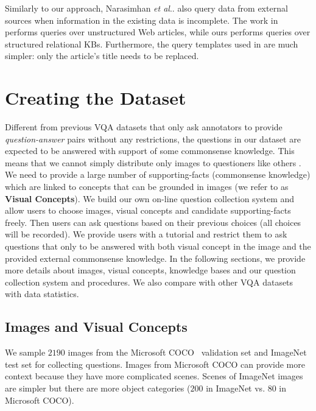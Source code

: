 \documentclass[10pt,journal]{IEEEtran}
\makeatletter
\DeclareRobustCommand\onedot{\futurelet\@let@token\@onedot}
\def\@onedot{\ifx\@let@token.\else.\null\fi\xspace}
\def\etal{\emph{et al}\onedot}
\def\bluett{}
\makeatother
\begin{document}
\bluett{
	Similarly to our approach, 
	Narasimhan \etal \cite{narasimhan2016improving} also query data from external sources when
	information in the existing data is incomplete.
	The work in \cite{narasimhan2016improving} performs queries over unstructured Web articles, while ours 
	performs queries over structured relational KBs.
	Furthermore, the query templates used in \cite{narasimhan2016improving} are much simpler: only the article’s title
	needs to be replaced.}



\section{Creating the \KBName Dataset}
\label{dataset}
Different from previous VQA datasets \cite{antol2015vqa,gao2015you,Yu_2015_ICCV,ren2015image,zhu2015visual7w} that only ask annotators to provide {\em question-answer} pairs without any restrictions, 
{the questions in our dataset are expected to be answered with support of some commonsense knowledge.}
This means that we cannot simply distribute only images to questioners like others \cite{antol2015vqa,zhu2015visual7w}. 
\bluett{
We need to provide a large number of supporting-facts (commonsense knowledge) which are linked to 
concepts that can be grounded in images (we refer to as {\bf Visual Concepts}). }
We build our own on-line question collection system and allow users to choose images, visual concepts and candidate supporting-facts freely. Then users can ask questions based on their previous choices (all choices will be recorded). We provide users with a tutorial and restrict them to ask questions that only to be answered with both visual concept in the image and the provided external commonsense knowledge. In the following sections, we provide more details about images, visual concepts, knowledge bases and our question collection system and procedures. We also compare with other VQA datasets with data statistics.

\subsection{Images and Visual Concepts}
\label{sec:imgvc}

We sample $2190$ images from the Microsoft COCO~\cite{lin2014microsoft} validation set and ImageNet~\cite{deng2009imagenet} test set for collecting questions. Images from Microsoft COCO can provide more context because they have more complicated scenes. Scenes of ImageNet images are simpler but there are more object categories ($200$ in ImageNet vs. $80$ in Microsoft COCO).
\end{document}
